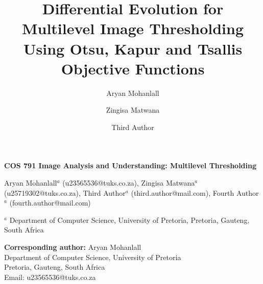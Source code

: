 \documentclass[review]{elsarticle}
\begin{document}
\begin{frontmatter}


\begin{titlepage}
\begin{center}

\vspace*{1cm}

\textbf{\large COS 791 Image Analysis and Understanding: Multilevel Thresholding}

\vspace{1.5cm}

Aryan Mohanlall$^{a}$ (u23565536@tuks.co.za),
Zingisa Matwana$^{a}$ (u25719302@tuks.co.za),
Third Author$^{a}$ (third.author@mail.com),
Fourth Author$^{a}$ (fourth.author@mail.com) \\

\vspace{0.5cm}

\begin{flushleft}
\small
$^a$ Department of Computer Science, University of Pretoria,
Pretoria, Gauteng, South Africa

\vspace{1cm}

\textbf{Corresponding author:} Aryan Mohanlall \\
Department of Computer Science, University of Pretoria \\
Pretoria, Gauteng, South Africa \\
Email: u23565536@tuks.co.za

\end{flushleft}

\end{center}
\end{titlepage}



\title{Differential Evolution for Multilevel Image Thresholding Using Otsu, Kapur and Tsallis Objective Functions}

\author[label1]{Aryan Mohanlall }

\author[label1]{Zingisa Matwana}

\author[label1]{Third Author}


\end{frontmatter}
\end{document}
